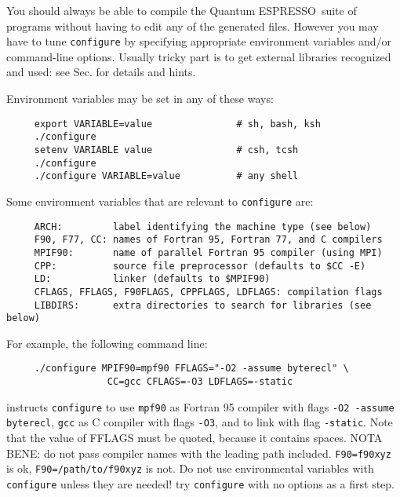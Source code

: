 \documentclass[12pt,a4paper]{article}
\def\qe{{\sc Quantum ESPRESSO}}
\begin{document}
You should always be able to compile the \qe\ suite
of programs without having to edit any of the generated files. However you
may have to tune \texttt{configure} by specifying appropriate environment variables
and/or command-line options. Usually tricky part is to get external
libraries recognized and used: see Sec.\label{Sec:Libraries}
for details and hints.

Environment variables may be set in any of these ways:
\begin{verbatim}
     export VARIABLE=value               # sh, bash, ksh
     ./configure
     setenv VARIABLE value               # csh, tcsh
     ./configure
     ./configure VARIABLE=value          # any shell
\end{verbatim}
Some environment variables that are relevant to \texttt{configure} are:
\begin{verbatim}
     ARCH:         label identifying the machine type (see below)
     F90, F77, CC: names of Fortran 95, Fortran 77, and C compilers
     MPIF90:       name of parallel Fortran 95 compiler (using MPI)
     CPP:          source file preprocessor (defaults to $CC -E)
     LD:           linker (defaults to $MPIF90)
     CFLAGS, FFLAGS, F90FLAGS, CPPFLAGS, LDFLAGS: compilation flags
     LIBDIRS:      extra directories to search for libraries (see below)
\end{verbatim}
For example, the following command line:
\begin{verbatim}
     ./configure MPIF90=mpf90 FFLAGS="-O2 -assume byterecl" \
                  CC=gcc CFLAGS=-O3 LDFLAGS=-static
\end{verbatim}
instructs \texttt{configure} to use \texttt{mpf90} as Fortran 95 compiler 
with flags \texttt{-O2 -assume byterecl}, \texttt{gcc} as C compiler with 
flags \texttt{-O3}, and to link with flag \texttt{-static}. 
Note that the value of FFLAGS must be quoted, because it contains
spaces. NOTA BENE: do not pass compiler names with the leading path
included. \texttt{F90=f90xyz} is ok, \texttt{F90=/path/to/f90xyz} is not. 
Do not use
environmental variables with \texttt{configure} unless they are needed! try
\texttt{configure} with no options as a first step.
\end{document}
